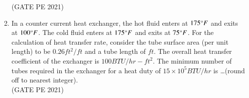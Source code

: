 \documentclass[journal,12pt,onecolumn]{IEEEtran}
\theoremstyle{remark}
\begin{document}
\begin{enumerate}
\hfill{(GATE PE 2021)}

\item In a counter current heat exchanger, the hot fluid enters at $175\degree F$ and exits at $100\degree F$. The cold fluid enters at $175\degree F$ and exits at $75\degree F$. For the calculation of heat transfer rate, consider the tube surface area (per unit length) to be $0.26ft^2/ft$ and a tube length of $ft$. The overall heat transfer coefficient of the exchanger is $100 BTU/hr-ft^2$. The minimum number of tubes required in the exchanger for a heat duty of $15\times10^5BTU/hr$ is \dots (round off to nearest integer).\\

\hfill{(GATE PE 2021)}

\newpage



\end{enumerate}
\end{document}
